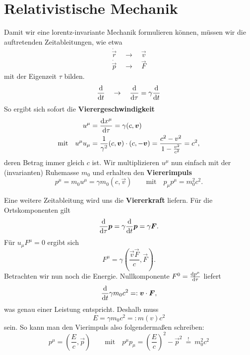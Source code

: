 \section{Relativistische Mechanik}

Damit wir eine lorentz-invariante Mechanik formulieren können, müssen wir die auftretenden Zeitableitungen, wie etwa
\begin{align*}
\dot{\vec{r}} \quad \rightarrow \quad \vec{v}\\
\dot{\vec{p}}\quad\rightarrow\quad\vec{F}
\end{align*}
mit der Eigenzeit $\tau$ bilden. 
\begin{equation*}
\frac{\mathrm{d}{}}{\mathrm{d}{t}}\quad\rightarrow\quad\frac{\mathrm{d}{}}{\mathrm{d}{\tau}}=\gamma\frac{\mathrm{d}{}}{\mathrm{d}{t}}
\end{equation*}
So ergibt sich sofort die \textbf{Vierergeschwindigkeit}
\begin{align*}
u^\mu &= \frac{\mathrm{d}{x^\mu}}{\mathrm{d}{\tau}} = \gamma(c,\bm{v})\\
\text{mit}\quad u^\mu u_\mu &= \frac{1}{\gamma^2}(c,\bm{v})\cdot (c,-\bm{v}) = \frac{c^2-v^2}{1-\frac{v^2}{c^2}} = c^2,
\end{align*}
deren Betrag immer gleich $c$ ist. Wir multiplizieren $u^\mu$ nun einfach mit der (invarianten) Ruhemasse $m_0$ und erhalten den \textbf{Viererimpuls}
\begin{equation*}
p^\mu = m_0 u^\mu = \gamma m_0 \left(c,\vec{v}\right)\qquad\text{mit}\quad p_\mu p^\mu = m_0^2c^2.
\end{equation*}

Eine weitere Zeitableitung wird uns die \textbf{Viererkraft} liefern. Für die Ortskomponenten gilt
\begin{equation*}
\frac{\mathrm{d}{}}{\mathrm{d}{\tau}}\bm{p}=\gamma\frac{\mathrm{d}{}}{\mathrm{d}{t}}\bm{p}=\gamma\bm{F}.
\end{equation*}
Für $u_\mu F^\mu =0$ ergibt sich
\begin{equation*}
F^\mu = \gamma\left(\frac{\vec{v}\vec{F}}{c},\vec{F}\right).
\end{equation*}
Betrachten wir nun noch die Energie. Nullkomponente $F^0 = \frac{\mathrm{d}{p^\mu}}{\mathrm{d}{\tau}}$ liefert
\begin{equation*}
\frac{\mathrm{d}{}}{\mathrm{d}{t}}\gamma m_0c^2 =:\bm{v}\cdot\bm{F},
\end{equation*}
was genau einer Leistung entspricht. Deshalb muss 
\begin{equation*}
E = \gamma m_0 c^2 =: m(v)c^2
\end{equation*}
sein. So kann man den Vierimpuls also folgendermaßen schreiben:
\begin{equation*}
p^\mu =\left(\frac{E}{c},\vec{p}\right)\qquad\text{mit}\quad p^\mu p_\mu = \left(\frac{E}{c}\right)^2 - \vec{p}^2 \ \stackrel{!}{=}\ m_0^2c^2
\end{equation*}

